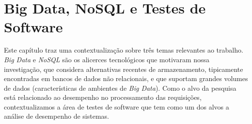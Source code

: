 \chapter{Big Data, NoSQL e Testes de Software}

Este capítulo traz uma contextualização sobre três temas relevantes ao trabalho. \emph{Big Data} e \emph{NoSQL} são os alicerces tecnológicos que motivaram nossa investigação, que considera alternativas recentes de armazenamento, tipicamente encontradas em bancos de dados não relacionais, e que suportam grandes volumes de dados (características de ambientes de \emph{Big Data}). Como o alvo da pesquisa está relacionado ao desempenho no processamento das requisições, contextualizamos a área de testes de software que tem como um dos alvos a análise de desempenho de sistemas. 




   